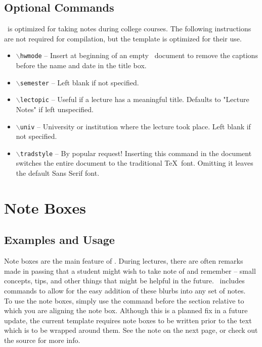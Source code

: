 \documentclass{ClassTeX2}
\begin{document}
	\subsection{Optional Commands}
	\ClassTeX\ is optimized for taking notes during college courses.  The following instructions are not required for compilation, but the template is optimized for their use.
	\begin{itemize}
		\item \texttt{$\backslash$hwmode} -- Insert at beginning of an empty \ClassTeX\ document to remove the captions before the name and date in the title box.
		\item \texttt{$\backslash$semester} -- Left blank if not specified.
		\item \texttt{$\backslash$lectopic} -- Useful if a lecture has a meaningful title.  Defaults to "Lecture Notes" if left unspecified.
		\item \texttt{$\backslash$univ} -- University or institution where the lecture took place.  Left blank if not specified.
		\item \texttt{$\backslash$tradstyle} -- By popular request!  Inserting this command in the document switches the entire document to the traditional \TeX\ font.  Omitting it leaves the default Sans Serif font.
	\end{itemize}

	\section{Note Boxes}
	
	\subsection{Examples and Usage}
		
	Note boxes are the main feature of \ClassTeX.  During lectures, there are often remarks made in passing that a student might wish to take note of and remember -- small concepts, tips, and other things that might be helpful in the future.  \ClassTeX\ includes commands to allow for the easy addition of these blurbs into any set of notes.\\

	To use the note boxes, simply use the command before the section relative to which you are aligning the note box.  Although this is a planned fix in a future update, the current template requires note boxes to be written prior to the text which is to be wrapped around them.  See the note on the next page, or check out the source for more info.\\
	
\end{document}
